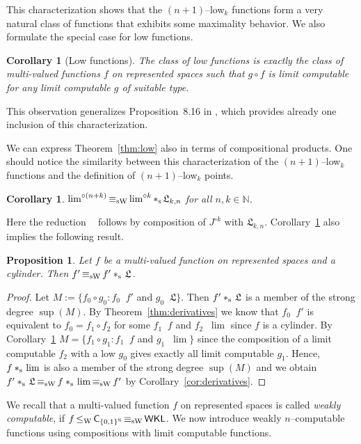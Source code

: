 \documentclass[a4paper]{amsart}
\def\IN{{\mathbb{N}}}
\def\Low{\mathfrak{L}}
\def\Cantor{{\{0,1\}^\IN}}
\def\WKL{\text{\rm\sffamily WKL}}
\def\C{\mbox{\rm\sffamily C}}
\def\leqW{\mathop{\leq_{\mathrm{W}}}}
\def\leqSW{\mathop{\leq_{\mathrm{sW}}}}
\def\equivSW{\mathop{\equiv_{\mathrm{sW}}}}
\def\stars{*_{\rm s}\;\!}
\newtheorem{proposition}[theorem]{Proposition}
\newtheorem{corollary}[theorem]{Corollary}
\theoremstyle{definition}
\begin{document}
This characterization shows that the $(n+1)$--low$_k$ functions form a very natural class of functions
that exhibits some maximality behavior. We also formulate the special case for low functions.

\begin{corollary}[Low functions]
\label{cor:low}
The class of low functions is exactly the class of multi-valued functions $f$ on represented spaces
such that $g\circ f$ is limit computable for any limit computable $g$ of suitable type.
\end{corollary}

This observation generalizes Proposition~8.16 in \cite{BBP}, which provides already one inclusion of this characterization.

We can express Theorem~\ref{thm:low} also in terms of compositional products.
One should notice the similarity between this characterization of the $(n+1)$--low$_k$ functions
and the definition of $(n+1)$--low$_k$ points.

\begin{corollary}
\label{cor:low-composition}
$\lim^{\circ(n+k)}\equivSW\lim^{\circ k}\stars\Low_{k,n}$ for all $n,k\in\IN$.
\end{corollary}

Here the reduction $\leqSW$ follows by composition of $J^{\circ k}$ with $\Low_{k,n}$.
Corollary~\ref{cor:low} also implies the following result.

\begin{proposition}
\label{prop:derivative-low}
Let $f$ be a multi-valued function on represented spaces and a cylinder. Then $f'\equivSW f'\stars\Low$.
\end{proposition}
\begin{proof}
Let $M:=\{f_0\circ g_0:f_0\leqSW f'$ and $g_0\leqSW\Low\}$. Then $f'\stars\Low$ is a member of the
strong degree $\sup(M)$.
By Theorem~\ref{thm:derivatives} we know that $f_0\leqSW f'$ is equivalent to
$f_0=f_1\circ f_2$ for some $f_1\leqSW f$ and $f_2\leqSW\lim$ since $f$ is a cylinder.
By Corollary~\ref{cor:low} $M=\{f_1\circ g_1:f_1\leqSW f$ and $g_1\leqSW\lim\}$ since the composition 
of a limit computable $f_2$ with a low $g_0$ gives exactly all limit computable $g_1$. Hence, 
$f\stars\lim$ is also a member of the strong degree $\sup(M)$ 
and we obtain $f'\stars\Low\equivSW f\stars\lim\equivSW f'$ by Corollary~\ref{cor:derivatives}.
\end{proof}

We recall that a multi-valued function $f$ on represented spaces is called {\em weakly computable},
if $f\leqW\C_\Cantor\equivSW\WKL$.
We now introduce weakly $n$--computable functions using compositions with limit computable
functions.
\end{document}
